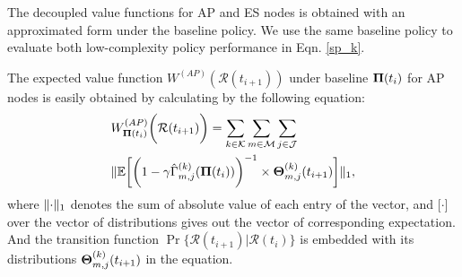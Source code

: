 The decoupled value functions for AP and ES nodes is obtained with an approximated form under the baseline policy. We use the same baseline policy to evaluate both low-complexity policy performance in Eqn. \ref{sp_k}.
        
The expected value function $W^{(AP)}(\mathcal{R}(t_{i+1}))$ under baseline $\boldsymbol{\Pi}(t_{i})$ for AP nodes is easily obtained by calculating by the following equation:
\begin{align}
    &W^{(AP)}_{\boldsymbol{\Pi}(t_i)}\bigg(\mathcal{R}(t_{i+1})\bigg) = \sum_{k\in\mathcal{K}}\sum_{m\in\mathcal{M}}\sum_{j\in\mathcal{J}}
    \nonumber\\
    & \lVert
        \mathbb{E}\bigg[
            \bigg(
                1 - \gamma \hat{\Gamma}^{(k)}_{m,j}(\boldsymbol{\Pi}(t_{i}))
            \bigg)^{-1} \times \boldsymbol{\Theta}^{(k)}_{m,j}(t_{i+1})
        \bigg]
    \|_1,
    \label{w_ap}
\end{align}
where $\lVert\cdot\|_1$ denotes the sum of absolute value of each entry of the vector, and $\mathbb[\cdot]$ over the vector of distributions gives out the vector of corresponding expectation. And the transition function $\Pr\{ \mathcal{R}(t_{i+1})|\mathcal{R}(t_{i}) \}$ is embedded with its distributions $\boldsymbol{\Theta}^{(k)}_{m,j}(t_{i+1})$ in the equation.


